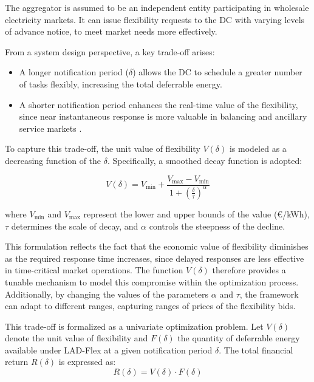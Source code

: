 \documentclass[preprint,12pt]{elsarticle}
\begin{document}
The aggregator is assumed to be an independent entity participating in wholesale electricity markets. It can issue flexibility requests to the DC with varying levels of advance notice, to meet market needs more effectively.

From a system design perspective, a key trade-off arises:
\begin{itemize}
    \item A longer notification period (\( \delta \)) allows the DC to schedule a greater number of tasks flexibly, increasing the total deferrable energy.
    \item A shorter notification period enhances the real-time value of the flexibility, since near instantaneous response is more valuable in balancing and ancillary service markets \cite{Villar2018, MohsenianRad2010, Conejo2010}.
\end{itemize}

To capture this trade-off, the unit value of flexibility \( V(\delta) \) is modeled as a decreasing function of the  \( \delta \). Specifically, a smoothed decay function is adopted:

\begin{equation}
V(\delta) = V_{\min} + \frac{V_{\max} - V_{\min}}{1 + \left( \frac{\delta}{\tau} \right)^{\alpha}}
\label{smooth_decay}
\end{equation}

where \( V_{\min} \) and \( V_{\max} \) represent the lower and upper bounds of the value (€/kWh), \( \tau \) determines the scale of decay, and \( \alpha \) controls the steepness of the decline.

This formulation reflects the fact that the economic value of flexibility diminishes as the required response time increases, since delayed responses are less effective in time-critical market operations. The function \( V(\delta) \) therefore provides a tunable mechanism to model this compromise within the optimization process. Additionally, by changing the values of the parameters $\alpha$ and $\tau$, the framework can adapt to different ranges, capturing ranges of prices of the flexibility bids.

This trade-off is formalized as a univariate optimization problem. Let \( V(\delta) \) denote the unit value of flexibility and \( F(\delta) \) the quantity of deferrable energy available under LAD-Flex at a given notification period \( \delta \). The total financial return \( R(\delta) \) is expressed as:
\begin{equation} \label{eq:max_returns}
    R(\delta) = V(\delta) \cdot F(\delta)
\end{equation}
\end{document}
